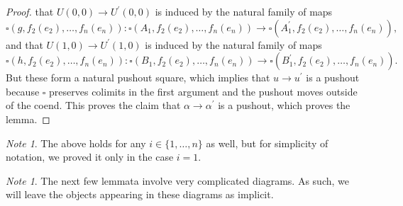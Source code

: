 \documentclass[leqno]{article}
\numberwithin{equation}{subsection}
\theoremstyle{plain}   %
\newtheorem{cor}[equation]{Corollary}
\theoremstyle{remark}
\newtheorem{note}[equation]{Note}
\theoremstyle{plain}
\begin{document}
\begin{proof}
	that \(U(0,0)\to U^\prime(0,0)\) is induced by the natural family of maps
	\[\square(g,f_2(e_2),\dots, f_n(e_n)): \square(A_1,f_2(e_2),\dots, f_n(e_n))\to \square(A^\prime_1,f_2(e_2),\dots,f_n(e_n)),\]
	and that \(U(1,0) \to U^\prime(1,0)\) is induced by the natural family of maps
	\[\square(h,f_2(e_2),\dots, f_n(e_n)): \square(B_1,f_2(e_2),\dots, f_n(e_n))\to \square(B^\prime_1,f_2(e_2),\dots,f_n(e_n)).\]
	But these form a natural pushout square, which implies that \(u\to u^\prime\) is a pushout because \(\square\) preserves colimits in the first argument and the pushout moves outside of the coend.  This proves the claim that \(\alpha\to \alpha^\prime\) is a pushout, which proves the lemma.
\end{proof}
\begin{note}
	The above holds for any \(i\in \{1,\dots,n\}\) as well, but for simplicity of notation, we proved it only in the case \(i=1\).  
\end{note}
\begin{comment}
	\begin{cor}
		If \(\square\) preserves pushouts in the \(i^{\mathrm{th}}\) argument, then if \(f_i\) is a pushout of \(f_i^\prime\), it 	follows that \(\square^\lrcorner(f_1,\dots,f_i,\dots,f_n)\) is a pushout of \(\square^\lrcorner(f_1,\dots,f^\prime_i,	\dots,f_n)\).
	\end{cor}
\end{comment}
\begin{note}
	The next few lemmata involve very complicated diagrams.  As such, we will leave the objects appearing in these diagrams as implicit.
\end{note}
\end{document}
